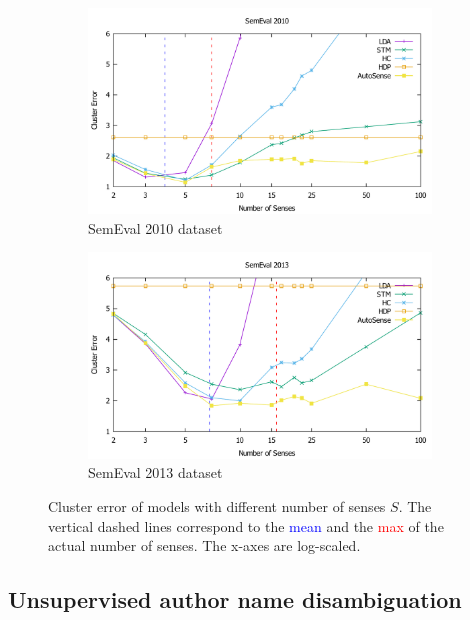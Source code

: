 \documentclass[letterpaper]{article} %
\begin{document}
\begin{figure}[!t]
	\centering
	\begin{subfigure}{0.45\textwidth}
	    \centering
		\includegraphics[width=\textwidth]{semeval2010_clusters}
		\caption{SemEval 2010 dataset}
	\end{subfigure}
	\begin{subfigure}{0.45\textwidth}
	    \centering
		\includegraphics[width=\textwidth]{semeval2013_clusters}
		\caption{SemEval 2013 dataset}
	\end{subfigure}
	\caption{Cluster error of models with different number of senses $S$. The vertical dashed lines correspond to the \textcolor{blue}{mean} and the \textcolor{red}{max} of the actual number of senses. The x-axes are log-scaled.}
	\label{fig:clusters}
\end{figure}

\subsection{Unsupervised author name disambiguation}
\end{document}
